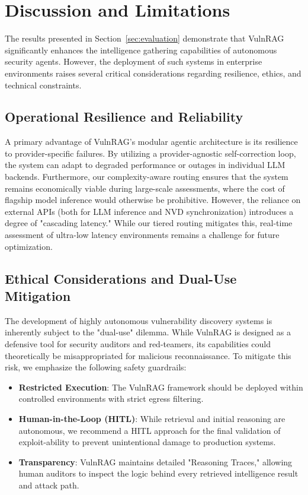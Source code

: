 \section{Discussion and Limitations}
\label{sec:discussion}

The results presented in Section~\ref{sec:evaluation} demonstrate that VulnRAG significantly enhances the intelligence gathering capabilities of autonomous security agents. However, the deployment of such systems in enterprise environments raises several critical considerations regarding resilience, ethics, and technical constraints.

\subsection{Operational Resilience and Reliability}
A primary advantage of VulnRAG’s modular agentic architecture is its resilience to provider-specific failures. By utilizing a provider-agnostic self-correction loop, the system can adapt to degraded performance or outages in individual LLM backends. Furthermore, our complexity-aware routing ensures that the system remains economically viable during large-scale assessments, where the cost of flagship model inference would otherwise be prohibitive. However, the reliance on external APIs (both for LLM inference and NVD synchronization) introduces a degree of "cascading latency." While our tiered routing mitigates this, real-time assessment of ultra-low latency environments remains a challenge for future optimization.

\subsection{Ethical Considerations and Dual-Use Mitigation}
The development of highly autonomous vulnerability discovery systems is inherently subject to the "dual-use" dilemma. While VulnRAG is designed as a defensive tool for security auditors and red-teamers, its capabilities could theoretically be misappropriated for malicious reconnaissance. To mitigate this risk, we emphasize the following safety guardrails:
\begin{itemize}
    \item \textbf{Restricted Execution}: The VulnRAG framework should be deployed within controlled environments with strict egress filtering.
    \item \textbf{Human-in-the-Loop (HITL)}: While retrieval and initial reasoning are autonomous, we recommend a HITL approach for the final validation of exploit-ability to prevent unintentional damage to production systems.
    \item \textbf{Transparency}: VulnRAG maintains detailed "Reasoning Traces," allowing human auditors to inspect the logic behind every retrieved intelligence result and attack path.
\end{itemize}

